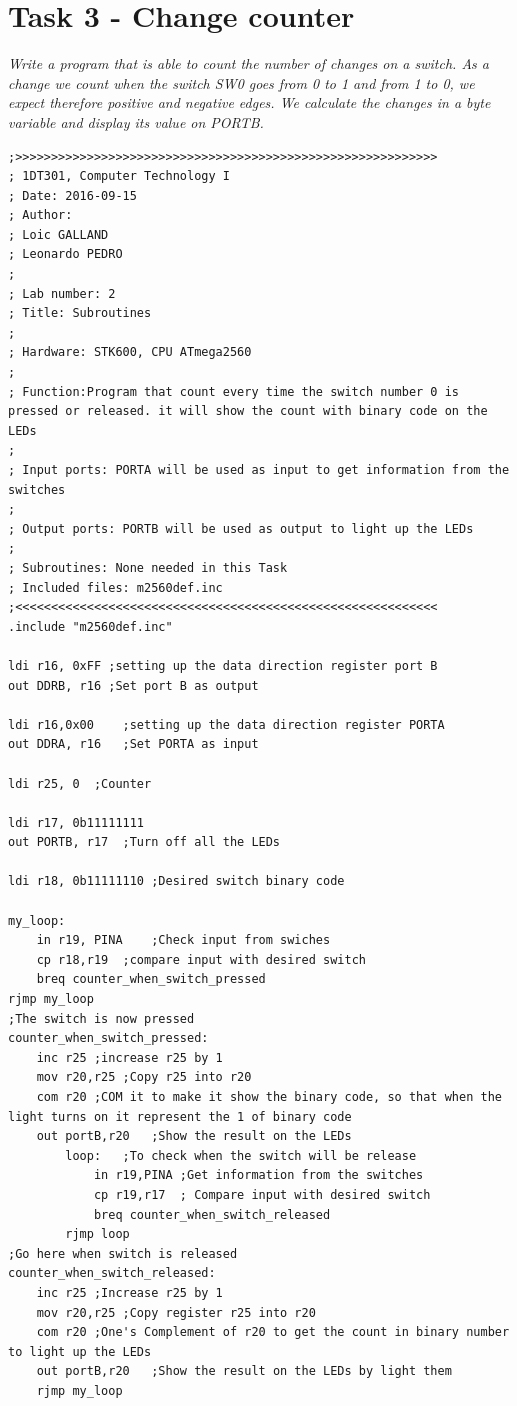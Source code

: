 \documentclass[a4paper,12pt]{article}
\begin{document}
\newpage
\section{Task 3 - Change counter}
\textit{Write a program that is able to count the number of changes on a switch. As a change we count
when the switch SW0 goes from 0 to 1 and from 1 to 0, we expect therefore positive and negative
edges. We calculate the changes in a byte variable and display its value on PORTB.}

\lstset{style=Asm}
\begin{lstlisting}
;>>>>>>>>>>>>>>>>>>>>>>>>>>>>>>>>>>>>>>>>>>>>>>>>>>>>>>>>>>>
; 1DT301, Computer Technology I
; Date: 2016-09-15
; Author:
; Loic GALLAND
; Leonardo PEDRO
;
; Lab number: 2
; Title: Subroutines
;
; Hardware: STK600, CPU ATmega2560
;
; Function:Program that count every time the switch number 0 is pressed or released. it will show the count with binary code on the LEDs
;
; Input ports: PORTA will be used as input to get information from the switches
;
; Output ports: PORTB will be used as output to light up the LEDs
;
; Subroutines: None needed in this Task
; Included files: m2560def.inc
;<<<<<<<<<<<<<<<<<<<<<<<<<<<<<<<<<<<<<<<<<<<<<<<<<<<<<<<<<<<
.include "m2560def.inc"

ldi r16, 0xFF ;setting up the data direction register port B
out DDRB, r16 ;Set port B as output

ldi r16,0x00	;setting up the data direction register PORTA
out DDRA, r16	;Set PORTA as input

ldi r25, 0	;Counter 

ldi r17, 0b11111111
out PORTB, r17	;Turn off all the LEDs

ldi r18, 0b11111110	;Desired switch binary code

my_loop:
	in r19, PINA	;Check input from swiches
	cp r18,r19	;compare input with desired switch
	breq counter_when_switch_pressed
rjmp my_loop
;The switch is now pressed
counter_when_switch_pressed:
	inc r25	;increase r25 by 1
	mov r20,r25	;Copy r25 into r20
	com r20	;COM it to make it show the binary code, so that when the light turns on it represent the 1 of binary code
	out portB,r20	;Show the result on the LEDs
		loop:	;To check when the switch will be release
			in r19,PINA	;Get information from the switches 
			cp r19,r17	; Compare input with desired switch
			breq counter_when_switch_released
		rjmp loop
;Go here when switch is released
counter_when_switch_released:
	inc r25	;Increase r25 by 1
	mov r20,r25	;Copy register r25 into r20
	com r20	;One's Complement of r20 to get the count in binary number to light up the LEDs
	out portB,r20	;Show the result on the LEDs by light them
	rjmp my_loop
\end{lstlisting}
\end{document}
